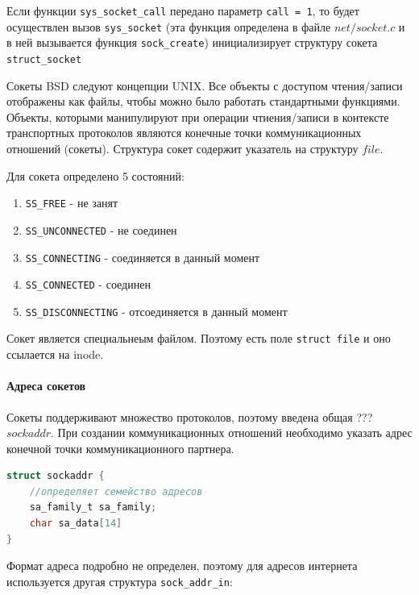  

Если функции \verb|sys_socket_call| передано параметр \verb|call = 1|, то будет осуществлен вызов \verb|sys_socket| (эта функция определена в файле $net/socket.c$ и в ней вызывается функция \verb|sock_create|) инициализирует структуру сокета \verb|struct_socket|

 

Сокеты BSD следуют концепции UNIX. Все объекты с доступом чтения/записи отображены как файлы, чтобы можно было работать стандартными функциями. Объекты, которыми манипулируют при операции чтиения/записи в контексте транспортных протоколов являются конечные точки коммуникационных отношений (сокеты). 
Структура сокет содержит указатель на структуру $file$. 

Для сокета определено 5 состояний:
\begin{enumerate}
	\item \verb|SS_FREE| - не занят
	\item \verb|SS_UNCONNECTED| - не соединен
	\item \verb|SS_CONNECTING| - соединяется в данный момент
	\item \verb|SS_CONNECTED| - соединен
	\item \verb|SS_DISCONNECTING| - отсоединяется в данный момент
\end{enumerate}

Сокет является специальнеым файлом. Поэтому есть поле \verb|struct file| и оно ссылается на inode. 

\paragraph{Адреса сокетов}

Сокеты поддерживают множество протоколов, поэтому введена общая ??? $sockaddr$. При создании коммуникационных отношений необходимо указать адрес конечной точки коммуникационного партнера. 

\begin{lstlisting}[language=c, caption = Структура sockaddr]
struct sockaddr {
	//определяет семейство адресов
	sa_family_t sa_family;
	char sa_data[14]
}
\end{lstlisting}

Формат адреса подробно не определен, поэтому для адресов интернета используется другая структура \verb|sock_addr_in|:


